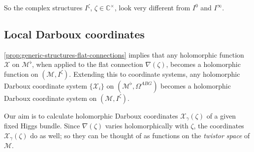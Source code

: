 \documentclass[12pt,letterpaper,reqno]{article}
\numberwithin{equation}{section}
\begin{document}
So the complex structures $I^\zeta$, $\zeta \in \mathbb C^\times$, look very different
from $I^0$ and $I^\infty$.

\subsection{Local Darboux coordinates}

\autoref{prop:generic-structures-flat-connections} 
implies that any holomorphic function $\mathcal X$ on $\mathcal M^\flat$,
when applied to
the flat connection $\nabla(\zeta)$, becomes a holomorphic
function on $(\mathcal M, I^\zeta)$.
Extending this to coordinate systems, any holomorphic 
Darboux coordinate system $\{\mathcal X_i\}$ on $(\mathcal M^\flat, \Omega^{ABG})$
becomes a holomorphic Darboux coordinate system on
$(\mathcal M, I^\zeta)$.

Our aim is to calculate holomorphic Darboux
coordinates $\mathcal X_\gamma(\zeta)$ of a given fixed Higgs bundle.
Since $\nabla(\zeta)$ varies
holomorphically with $\zeta$, the coordinates
$\mathcal X_\gamma(\zeta)$ do as well; so they can be thought of
as functions on the \textit{twistor space} of $\mathcal M$.
\end{document}
